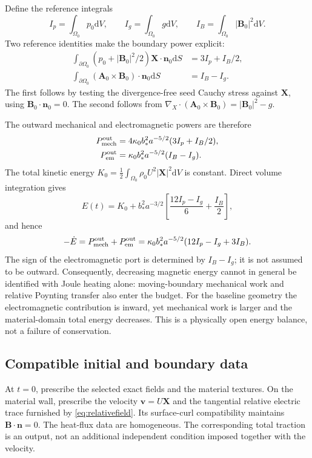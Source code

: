 \documentclass[11pt,a4paper]{article}
\theoremstyle{remark}\newtheorem{remark}{Remark}
\numberwithin{equation}{section}
\newcommand{\dd}{\mathrm{d}}
\newcommand{\vv}{\boldsymbol v}
\newcommand{\BB}{\boldsymbol B}
\newcommand{\Avec}{\boldsymbol A}
\newcommand{\XX}{\boldsymbol X}
\newcommand{\nn}{\boldsymbol n}
\newcommand{\grad}{\nabla}
\begin{document}
Define the reference integrals
\begin{equation}
I_p=\int_{\Omega_0}p_0\dd V,\qquad
I_g=\int_{\Omega_0}g\dd V,\qquad
I_B=\int_{\Omega_0}|\BB_0|^2\dd V.
\label{eq:integrals}
\end{equation}
Two reference identities make the boundary power explicit:
\begin{equation}
\begin{aligned}
\int_{\partial\Omega_0}(p_0+|\BB_0|^2/2)\XX\cdot\nn_0\dd S
&=3I_p+I_B/2,\\
\int_{\partial\Omega_0}(\Avec_0\times\BB_0)\cdot\nn_0\dd S
&=I_B-I_g.
\end{aligned}
\label{eq:referenceports}
\end{equation}
The first follows by testing the divergence-free seed Cauchy stress against $\XX$, using $\BB_0\cdot\nn_0=0$. The second follows from $\grad_X\cdot(\Avec_0\times\BB_0)=|\BB_0|^2-g$.

The outward mechanical and electromagnetic powers are therefore
\begin{equation}
\begin{aligned}
P_{\rm mech}^{\rm out}&=4\kappa_0b_*^2a^{-5/2}(3I_p+I_B/2),\\
P_{\rm em}^{\rm out}&=\kappa_0b_*^2a^{-5/2}(I_B-I_g).
\end{aligned}
\label{eq:outwardpowers}
\end{equation}
The total kinetic energy $K_0=\frac12\int_{\Omega_0}\rho_0U^2|\XX|^2\dd V$ is constant. Direct volume integration gives
\begin{equation}
E(t)=K_0+b_*^2a^{-3/2}
\left[\frac{12I_p-I_g}{6}+\frac{I_B}{2}\right],
\label{eq:integratedenergy}
\end{equation}
and hence
\begin{equation}
-\dot E=P_{\rm mech}^{\rm out}+P_{\rm em}^{\rm out}
=\kappa_0b_*^2a^{-5/2}(12I_p-I_g+3I_B).
\label{eq:globalenergy}
\end{equation}
The sign of the electromagnetic port is determined by $I_B-I_g$; it is not assumed to be outward. Consequently, decreasing magnetic energy cannot in general be identified with Joule heating alone: moving-boundary mechanical work and relative Poynting transfer also enter the budget. For the baseline geometry the electromagnetic contribution is inward, yet mechanical work is larger and the material-domain total energy decreases. This is a physically open energy balance, not a failure of conservation.

\subsection{Compatible initial and boundary data}\label{sec:boundary}
At $t=0$, prescribe the selected exact fields and the material textures. On the material wall, prescribe the velocity $\vv=U\XX$ and the tangential relative electric trace furnished by \eqref{eq:relativefield}. Its surface-curl compatibility maintains $\BB\cdot\nn=0$. The heat-flux data are homogeneous. The corresponding total traction is an output, not an additional independent condition imposed together with the velocity.
\end{document}

